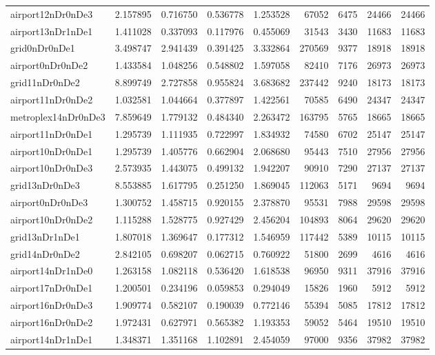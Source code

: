 \begin{longtable}{|l|r|r|r|r|r|r|r|r|}
airport12nDr0nDe3 & 2.157895 & 0.716750 & 0.536778 & 1.253528 & 67052 & 6475 & 24466 & 24466 \\
airport13nDr1nDe1 & 1.411028 & 0.337093 & 0.117976 & 0.455069 & 31543 & 3430 & 11683 & 11683 \\
grid0nDr0nDe1 & 3.498747 & 2.941439 & 0.391425 & 3.332864 & 270569 & 9377 & 18918 & 18918 \\
airport0nDr0nDe2 & 1.433584 & 1.048256 & 0.548802 & 1.597058 & 82410 & 7176 & 26973 & 26973 \\
grid11nDr0nDe2 & 8.899749 & 2.727858 & 0.955824 & 3.683682 & 237442 & 9240 & 18173 & 18173 \\
airport11nDr0nDe2 & 1.032581 & 1.044664 & 0.377897 & 1.422561 & 70585 & 6490 & 24347 & 24347 \\
metroplex14nDr0nDe3 & 7.859649 & 1.779132 & 0.484340 & 2.263472 & 163795 & 5765 & 18665 & 18665 \\
airport11nDr0nDe1 & 1.295739 & 1.111935 & 0.722997 & 1.834932 & 74580 & 6702 & 25147 & 25147 \\
airport10nDr0nDe1 & 1.295739 & 1.405776 & 0.662904 & 2.068680 & 95443 & 7510 & 27956 & 27956 \\
airport10nDr0nDe3 & 2.573935 & 1.443075 & 0.499132 & 1.942207 & 90910 & 7290 & 27137 & 27137 \\
grid13nDr0nDe3 & 8.553885 & 1.617795 & 0.251250 & 1.869045 & 112063 & 5171 & 9694 & 9694 \\
airport0nDr0nDe3 & 1.300752 & 1.458715 & 0.920155 & 2.378870 & 95531 & 7988 & 29598 & 29598 \\
airport10nDr0nDe2 & 1.115288 & 1.528775 & 0.927429 & 2.456204 & 104893 & 8064 & 29620 & 29620 \\
grid13nDr1nDe1 & 1.807018 & 1.369647 & 0.177312 & 1.546959 & 117442 & 5389 & 10115 & 10115 \\
grid14nDr0nDe2 & 2.842105 & 0.698207 & 0.062715 & 0.760922 & 51800 & 2699 & 4616 & 4616 \\
airport14nDr1nDe0 & 1.263158 & 1.082118 & 0.536420 & 1.618538 & 96950 & 9311 & 37916 & 37916 \\
airport17nDr0nDe1 & 1.200501 & 0.234196 & 0.059853 & 0.294049 & 15826 & 1960 & 5912 & 5912 \\
airport16nDr0nDe3 & 1.909774 & 0.582107 & 0.190039 & 0.772146 & 55394 & 5085 & 17812 & 17812 \\
airport16nDr0nDe2 & 1.972431 & 0.627971 & 0.565382 & 1.193353 & 59052 & 5464 & 19510 & 19510 \\
airport14nDr1nDe1 & 1.348371 & 1.351168 & 1.102891 & 2.454059 & 97000 & 9356 & 37982 & 37982 \\

\end{longtable}

